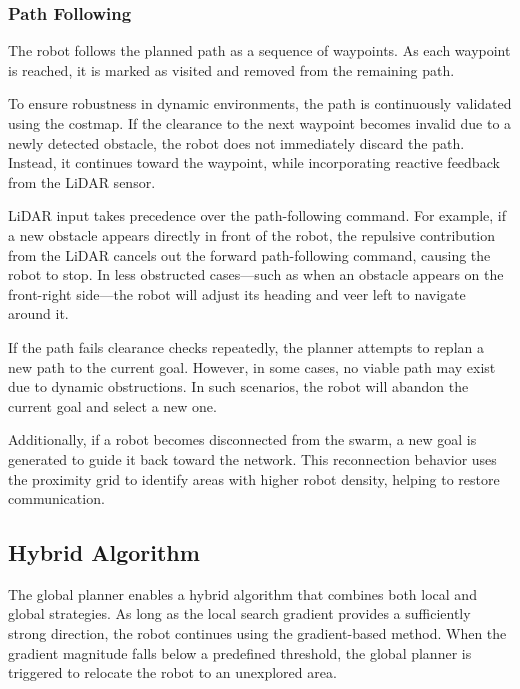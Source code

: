 \subsubsection{Path Following}
\label{sec:path_following}
The robot follows the planned path as a sequence of waypoints. As each waypoint is reached, it is marked as visited and removed from the remaining path.

To ensure robustness in dynamic environments, the path is continuously validated using the costmap. If the clearance to the next waypoint becomes invalid due to a newly detected obstacle, the robot does not immediately discard the path. Instead, it continues toward the waypoint, while incorporating reactive feedback from the LiDAR sensor.

LiDAR input takes precedence over the path-following command. For example, if a new obstacle appears directly in front of the robot, the repulsive contribution from the LiDAR cancels out the forward path-following command, causing the robot to stop. In less obstructed cases—such as when an obstacle appears on the front-right side—the robot will adjust its heading and veer left to navigate around it.

If the path fails clearance checks repeatedly, the planner attempts to replan a new path to the current goal. However, in some cases, no viable path may exist due to dynamic obstructions. In such scenarios, the robot will abandon the current goal and select a new one.

Additionally, if a robot becomes disconnected from the swarm, a new goal is generated to guide it back toward the network. This reconnection behavior uses the proximity grid to identify areas with higher robot density, helping to restore communication.

\subsection{Hybrid Algorithm}
The global planner enables a hybrid algorithm that combines both local and global strategies. As long as the local search gradient provides a sufficiently strong direction, the robot continues using the gradient-based method. When the gradient magnitude falls below a predefined threshold, the global planner is triggered to relocate the robot to an unexplored area.

